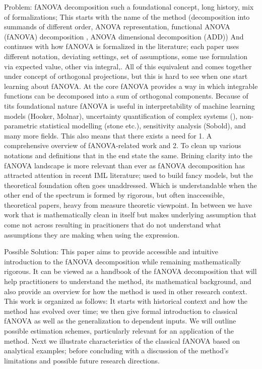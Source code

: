 
Problem: fANOVA decomposition such a foundational concept, long history, mix of formalizations;
This starts with the name of the method (decomposition into summands of different order, ANOVA representation, functional ANOVA (fANOVA) decomposition \cite{hooker2004}, ANOVA dimensional decomposition (ADD))
And continues with how fANOVA is formalized in the literature; each paper uses different notation, deviating settings, set of assumptions, some use formulation via expected value, other via integral,.
All of this equivalent and comes together under concept of orthogonal projections, but this is hard to see when one start learning about fANOVA.
At the core fANOVA provides a way in which integrable functions can be decomposed into a sum of orthogonal components. Because of tits foundational nature fANOVA is useful in interpretability of machine learning models (Hooker, Molnar), uncertainty quantification of complex systems (\cite{rahman2014}), non-parametric statistical modelling (stone etc.), sensitivity analysis (Sobold), and many more fields.
This also means that there exists a need for 1. A comprehensive overview of fANOVA-related work and 2. To clean up various notations and definitions that in the end state the same.
Brining clarity into the fANOVA landscape is more relevant than ever as fANOVA decomposition has attracted attention in recent IML literature; used to build fancy models, but the theoretical foundation often goes unaddressed.
Which is understandable when the other end of the spectrum is formed by rigorous, but often inaccessible, theoretical papers, heavy from measure theoretic viewpoint. In between we have work that is mathematically clean in itself but makes underlying assumption that come not across resulting in pracitioners that do not understand what assumptions they are making when using the expression.

Possible Solution: This paper aims to provide accessible and intuitive introduction to the fANOVA decomposition while remaining mathematically rigorous.
It can be viewed as a handbook of the fANOVA decomposition that will help practitioners to understand the method, its mathematical background, and also provide an overview for how the method is used in other research context.
This work is organized as follows: It starts with historical context and how the method has evolved over time; we then give formal introduction to classical fANOVA as well as the generalization to dependent inputs. We will outline possible estimation schemes, particularly relevant for an application of the method. Next we illustrate characteristics of the classical fANOVA based on analytical examples; before concluding with a discussion of the method's limitations and possible future research directions.
